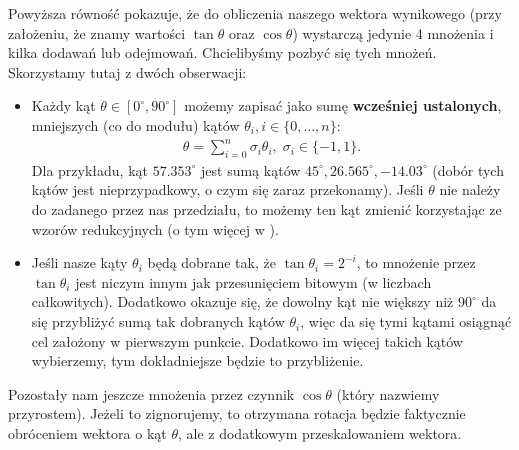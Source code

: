 \documentclass{mwart}
\theoremstyle{remark}
\theoremstyle{definition}
\theoremstyle{definition}
\begin{document}
Powyższa równość pokazuje, że do obliczenia naszego wektora wynikowego (przy założeniu, że znamy wartości $\tan\theta$ oraz $\cos\theta$) wystarczą jedynie 4 mnożenia i kilka dodawań lub odejmowań. Chcielibyśmy pozbyć się tych mnożeń. Skorzystamy tutaj z dwóch obserwacji:
\begin{itemize}
  \item Każdy kąt $\theta\in [0^{\circ}, 90^{\circ}]$ możemy zapisać jako sumę \textbf{wcześniej ustalonych}, mniejszych (co do modułu) kątów $\theta_i, i \in \{0, ..., n\}$:
        \begin{align}
          \theta = \sum_{i=0}^n \sigma_i\theta_i, \; \sigma_i \in \{-1, 1\}.
        \end{align}
        Dla przykładu, kąt $57.353^{\circ}$ jest sumą kątów
        $45^{\circ}, 26.565^{\circ}, -14.03^{\circ}$ (dobór tych kątów jest nieprzypadkowy, o czym się zaraz przekonamy). 
        Jeśli $\theta$ nie należy do zadanego przez nas przedziału, to możemy ten kąt zmienić korzystając ze wzorów redukcyjnych 
        (o tym więcej w ).
  \item Jeśli nasze kąty $\theta_i$ będą dobrane tak, że $\tan\theta_i = 2^{-i}$, to mnożenie przez $\tan\theta_i$ jest niczym innym jak przesunięciem bitowym (w liczbach całkowitych). Dodatkowo okazuje się, że dowolny kąt nie większy niż $90^{\circ}$ da się przybliżyć sumą tak dobranych kątów $\theta_i$, więc da się tymi kątami osiągnąć cel założony w pierwszym punkcie. Dodatkowo im więcej takich kątów wybierzemy, tym dokładniejsze będzie to przybliżenie.
\end{itemize}

Pozostały nam jeszcze mnożenia przez czynnik $\cos\theta$ (który nazwiemy przyrostem). Jeżeli to zignorujemy, to otrzymana rotacja będzie faktycznie obróceniem wektora o kąt $\theta$, ale z dodatkowym przeskalowaniem wektora.

\end{document}
